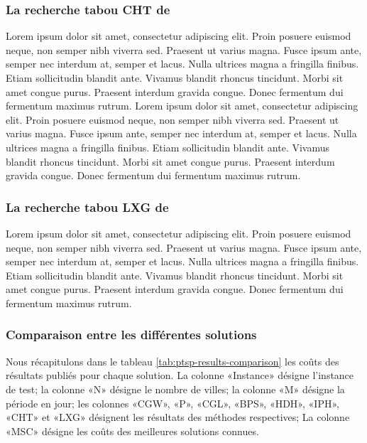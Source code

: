 \medskip

\subsubsection{La recherche tabou CHT de \parencite{cacchiani_set-covering_2014}}
Lorem ipsum dolor sit amet, consectetur adipiscing elit. Proin posuere euismod neque, non semper nibh viverra sed. Praesent ut varius magna. Fusce ipsum ante, semper nec interdum at, semper et lacus. Nulla ultrices magna a fringilla finibus. Etiam sollicitudin blandit ante. Vivamus blandit rhoncus tincidunt. Morbi sit amet congue purus. Praesent interdum gravida congue. Donec fermentum dui fermentum maximus rutrum. \parencite{hemmelmayr_variable_2009} Lorem ipsum dolor sit amet, consectetur adipiscing elit. Proin posuere euismod neque, non semper nibh viverra sed. Praesent ut varius magna. Fusce ipsum ante, semper nec interdum at, semper et lacus. Nulla ultrices magna a fringilla finibus. Etiam sollicitudin blandit ante. Vivamus blandit rhoncus tincidunt. Morbi sit amet congue purus. Praesent interdum gravida congue. Donec fermentum dui fermentum maximus rutrum.

\medskip

\subsubsection{La recherche tabou LXG de \parencite{liu_hybridization_2014}}
Lorem ipsum dolor sit amet, consectetur adipiscing elit. Proin posuere euismod neque, non semper nibh viverra sed. Praesent ut varius magna. Fusce ipsum ante, semper nec interdum at, semper et lacus. Nulla ultrices magna a fringilla finibus. Etiam sollicitudin blandit ante. Vivamus blandit rhoncus tincidunt. Morbi sit amet congue purus. Praesent interdum gravida congue. Donec fermentum dui fermentum maximus rutrum.

\medskip

\subsubsection{Comparaison entre les différentes solutions}
\label{sec:ptps-comparison}
Nous récapitulons dans le tableau \ref{tab:ptsp-results-comparison} les coûts des résultats publiés pour chaque solution. La colonne «Instance» désigne l'instance de test; la colonne «N» désigne le nombre de villes; la colonne «M» désigne la période en jour; les colonnes «CGW», «P», «CGL», «BPS», «HDH», «IPH», «CHT» et «LXG» désignent les résultats des méthodes respectives; La colonne «MSC» désigne les coûts des meilleures solutions connues.

